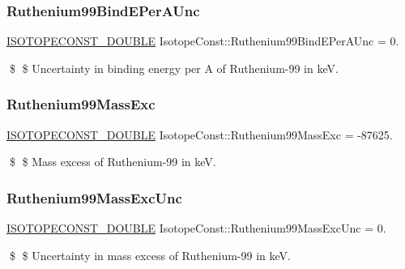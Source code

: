 \subsubsection{\texorpdfstring{Ruthenium99\+Bind\+E\+Per\+A\+Unc}{Ruthenium99BindEPerAUnc}}
{\footnotesize\ttfamily \mbox{\hyperlink{group___isotope_const-_macros_ga8f45a7272ce02c0b4c65c44636ed719a}{I\+S\+O\+T\+O\+P\+E\+C\+O\+N\+S\+T\+\_\+\+D\+O\+U\+B\+LE}} Isotope\+Const\+::\+Ruthenium99\+Bind\+E\+Per\+A\+Unc = 0.}

\$ \$ Uncertainty in binding energy per A of Ruthenium-\/99 in keV. \mbox{\label{group___isotope_const-_ruthenium-_ru99_ga35c21ad9e63c1d71b1936264ea892059}} 
\subsubsection{\texorpdfstring{Ruthenium99\+Mass\+Exc}{Ruthenium99MassExc}}
{\footnotesize\ttfamily \mbox{\hyperlink{group___isotope_const-_macros_ga8f45a7272ce02c0b4c65c44636ed719a}{I\+S\+O\+T\+O\+P\+E\+C\+O\+N\+S\+T\+\_\+\+D\+O\+U\+B\+LE}} Isotope\+Const\+::\+Ruthenium99\+Mass\+Exc = -\/87625.}

\$ \$ Mass excess of Ruthenium-\/99 in keV. \mbox{\label{group___isotope_const-_ruthenium-_ru99_ga90f1dad5e738c7765cc030ac1f861188}} 
\subsubsection{\texorpdfstring{Ruthenium99\+Mass\+Exc\+Unc}{Ruthenium99MassExcUnc}}
{\footnotesize\ttfamily \mbox{\hyperlink{group___isotope_const-_macros_ga8f45a7272ce02c0b4c65c44636ed719a}{I\+S\+O\+T\+O\+P\+E\+C\+O\+N\+S\+T\+\_\+\+D\+O\+U\+B\+LE}} Isotope\+Const\+::\+Ruthenium99\+Mass\+Exc\+Unc = 0.}

\$ \$ Uncertainty in mass excess of Ruthenium-\/99 in keV. \mbox{\label{group___isotope_const-_ruthenium-_ru99_gaf3db43a412be594da0476027a81007a2}} 

